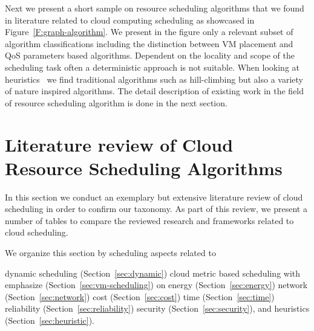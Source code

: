 \documentclass[final,5p,times,twocolumn]{elsarticle}
\begin{document}
Next we present a short sample on resource scheduling algorithms that
we found in literature related to cloud computing scheduling as
showcased in Figure~\ref{F:graph-algorithm}. We present in the
figure only a relevant subset of algorithm classifications including
the distinction between VM placement and QoS parameters based
algorithms. Dependent on the locality and scope of the scheduling task
often a deterministic approach is not suitable. When looking at
heuristics~\cite{vivekanandan2011study} we find traditional algorithms
such as hill-climbing but also a variety of nature inspired
algorithms. The detail description of existing work in the field of
resource scheduling algorithm is done in the next section.









\section{Literature review of Cloud Resource Scheduling Algorithms}\label{sec:literature}



In this section we conduct an exemplary but extensive literature
review of cloud scheduling in order to confirm our taxonomy. As part
of this review, we present a number of tables to compare the reviewed
research and frameworks related to cloud scheduling.

We organize this section by scheduling aspects related to 

dynamic scheduling (Section~\ref{sec:dynamic})
cloud metric based scheduling with emphasize (Section~\ref{sec:vm-scheduling}) on 
energy (Section~\ref{sec:energy})
network (Section~\ref{sec:network})
cost (Section~\ref{sec:cost})
time (Section~\ref{sec:time})
reliability (Section~\ref{sec:reliability})
security (Section~\ref{sec:security}),
and heuristics (Section~\ref{sec:heuristic}).
\end{document}
